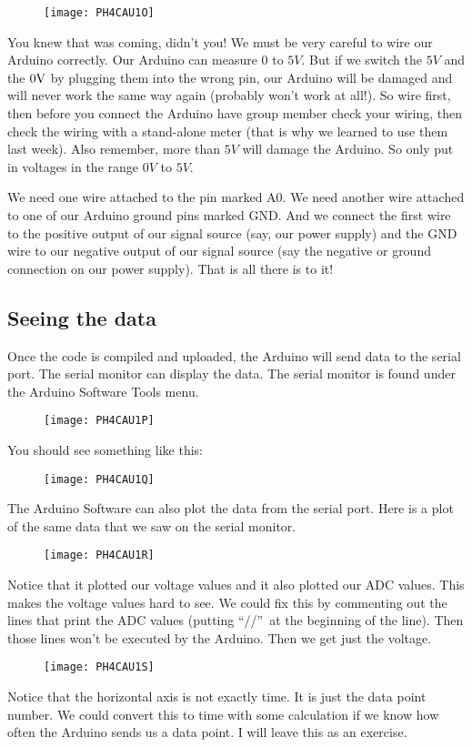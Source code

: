 \begin{figure}[h!]
\texttt{[image: PH4CAU1O]}
\end{figure}You knew that was coming, didn't
you! We must be very careful to wire our Arduino correctly. Our Arduino can
measure $0$ to $5\unit{V}.$ But if we switch the $5\unit{V}$ and the $0\unit{%
V}$ by plugging them into the wrong pin, our Arduino will be damaged and
will never work the same way again (probably won't work at all!). So wire
first, then before you connect the Arduino have group member check your
wiring, then check the wiring with a stand-alone meter (that is why we
learned to use them last week). Also remember, more than $5\unit{V}$ will
damage the Arduino. So only put in voltages in the range $0\unit{V}$ to $5%
\unit{V}.$

We need one wire attached to the pin marked A0. We need another wire
attached to one of our Arduino ground pins marked GND. And we connect the
first wire to the positive output of our signal source (say, our power
supply) and the GND wire to our negative output of our signal source (say
the negative or ground connection on our power supply). That is all there is
to it!

\subsection{Seeing the data}

Once the code is compiled and uploaded, the Arduino will send data to the
serial port. The serial monitor can display the data. The serial monitor is
found under the Arduino Software Tools menu.

\begin{figure}[h!]
\texttt{[image: PH4CAU1P]}
\end{figure}You should see something like
this:

\begin{figure}[h!]
\texttt{[image: PH4CAU1Q]}
\end{figure}

The Arduino Software can also plot the data from the serial port. Here is a
plot of the same data that we saw on the serial monitor. \begin{figure}[h!]
\texttt{[image: PH4CAU1R]}
\end{figure}Notice that it plotted our
voltage values and it also plotted our ADC values. This makes the voltage
values hard to see. We could fix this by commenting out the lines that print
the ADC values (putting \textquotedblleft //\textquotedblright\ at the
beginning of the line). Then those lines won't be executed by the Arduino.
Then we get just the voltage. \begin{figure}[h!]
\texttt{[image: PH4CAU1S]}
\end{figure}Notice that the horizontal axis
is not exactly time. It is just the data point number. We could convert this
to time with some calculation if we know how often the Arduino sends us a
data point. I will leave this as an exercise.

